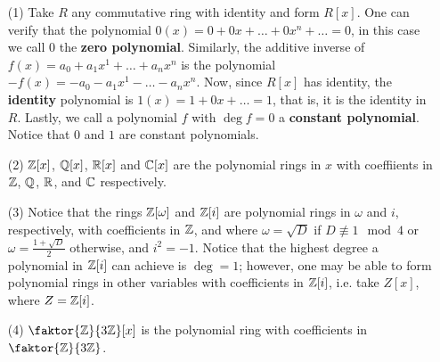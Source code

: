\begin{example}\label{example_5.6}
    \begin{enumerate}
        \item[(1)] Take $R$ any commutative ring with identity and form $R[x]$.
            One can verify that the polynomial $0(x)=0+0x+\dots+0x^n+\dots=0$,
            in this case we call $0$ the \textbf{zero polynomial}. Similarly,
            the additive inverse of $f(x)=a_0+a_1x^1+\dots+a_nx^n$ is the
            polynomial $-f(x)=-a_0-a_1x^1-\dots-a_nx^n$. Now, since $R[x]$ has
            identity, the \textbf{identity} polynomial is $1(x)=1+0x+\dots=1$,
            that is, it is the identity in $R$. Lastly, we call a polynomial $f$
            with  $\deg{f}=0$ a \textbf{constant polynomial}. Notice that $0$
            and  $1$ are constant polynomials.

        \item[(2)] $\mathbb{Z}[x]$, $\mathbb{Q}[x]$, $\mathbb{R}[x]$ and $\mathbb{C}[x]$ are the polynomial
            rings in $x$ with coeffiients in $\mathbb{Z}$, $\mathbb{Q}$, $\mathbb{R}$, and $\mathbb{C}$
            respectively.

        \item[(3)] Notice that the rings $\mathbb{Z}[\omega]$ and $\mathbb{Z}[i]$ are polynomial
            rings in $\omega$ and  $i$, respectively, with coefficients in $\mathbb{Z}$,
            and where $\omega=\sqrt{D}$ if $D \not\equiv 1 \mod{4}$ or
            $\omega=\frac{1+\sqrt{D}}{2}$ otherwise, and $i^2=-1$. Notice that
            the highest degree a polynomial in  $\mathbb{Z}[i]$ can achieve is $\deg=1$;
            however, one may be able to form polynomial rings in other variables
            with coefficients in $\mathbb{Z}[i]$, i.e. take $Z[x]$, where $Z=\mathbb{Z}[i]$.

        \item[(4)] $\faktor{\Z}{3\Z}[x]$ is the polynomial ring with
            coefficients in $\faktor{\Z}{3\Z}$.
    \end{enumerate}
\end{example}

